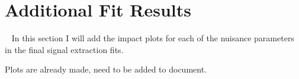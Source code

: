 \chapter{Additional Fit Results}~\label{ch:fitpulls}
In this section I will add the impact plots for each of the nuisance parameters in the final signal extraction fits. 

Plots are already made, need to be added to document.
